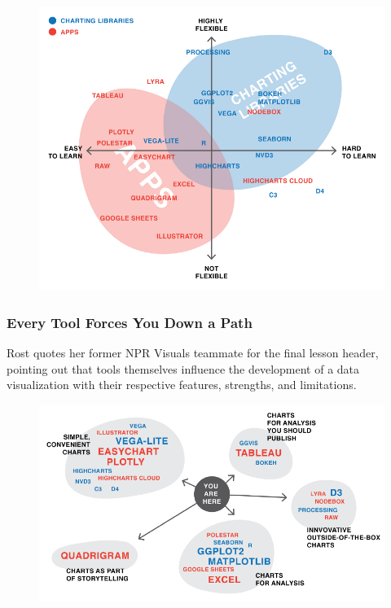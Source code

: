 \documentclass[]{book}
\theoremstyle{definition}
\theoremstyle{definition}
\theoremstyle{definition}
\theoremstyle{remark}
\begin{document}
\begin{figure}
\centering
\includegraphics{images/apps_vs_code.png}
\caption{}
\end{figure}

\subsubsection{Every Tool Forces You Down a
Path}\label{every-tool-forces-you-down-a-path}

Rost quotes her former NPR Visuals teammate for the final lesson header,
pointing out that tools themselves influence the development of a data
visualization with their respective features, strengths, and
limitations.

\begin{figure}
\centering
\includegraphics{images/tools_force_paths.png}
\caption{}
\end{figure}
\end{document}
